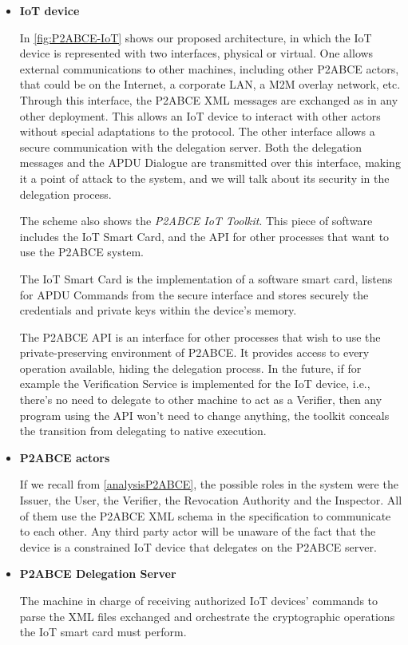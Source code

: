 \begin{itemize}
	
	\item \textbf{IoT device}
	
	In \autoref{fig:P2ABCE-IoT} shows our proposed architecture, in which the IoT device is represented with two interfaces, physical or virtual. One allows external communications to other machines, including other P2ABCE actors, that could be on the Internet, a corporate LAN, a M2M overlay network, etc. Through this interface, the P2ABCE XML messages are exchanged as in any other deployment. This allows an IoT device to interact with other actors without special adaptations to the protocol. The other interface allows a secure communication with the delegation server. Both the delegation messages and the APDU Dialogue are transmitted over this interface, making it a point of attack to the system, and we will talk about its security in the delegation process.
	
	The scheme also shows the \textit{P2ABCE IoT Toolkit}. This piece of software includes the IoT Smart Card, and the API for other processes that want to use the P2ABCE system.
	
	The IoT Smart Card is the implementation of a software smart card, listens for APDU Commands from the secure interface and stores securely the credentials and private keys within the device's memory.
	
	The P2ABCE API is an interface for other processes that wish to use the private-preserving environment of P2ABCE. It provides access to every operation available, hiding the delegation process. In the future, if for example the Verification Service is implemented for the IoT device, i.e., there's no need to delegate to other machine to act as a Verifier, then any program using the API won't need to change anything, the toolkit conceals the transition from delegating to native execution.
	
	
	\item \textbf{P2ABCE actors}
	
	If we recall from \autoref{analysisP2ABCE}, the possible roles in the system were the Issuer, the User, the Verifier, the Revocation Authority and the Inspector. All of them use the P2ABCE XML schema in the specification to communicate to each other. Any third party actor will be unaware of the fact that the device is a constrained IoT device that delegates on the P2ABCE server.



	\item \textbf{P2ABCE Delegation Server}
	
	The machine in charge of receiving authorized IoT devices' commands to parse the XML files exchanged and orchestrate the cryptographic operations the IoT smart card must perform.


\end{itemize}

